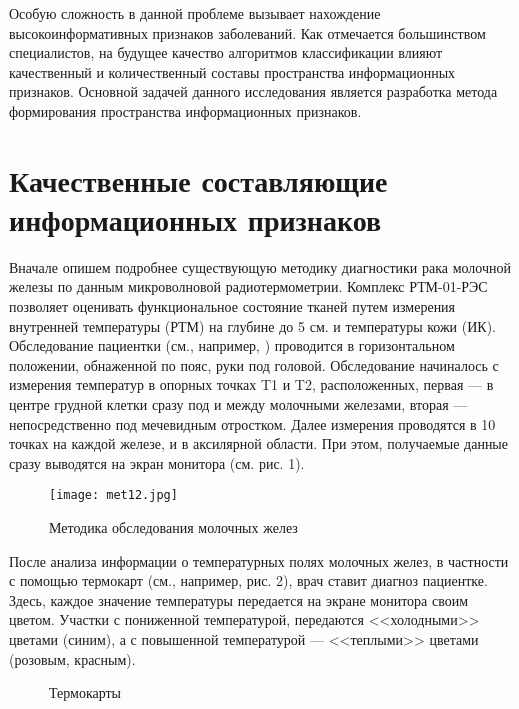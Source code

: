 Особую сложность в данной проблеме вызывает нахождение
высокоинформативных признаков заболеваний. Как отмечается
большинством специалистов, на будущее качество алгоритмов
классификации влияют качественный и количественный составы
пространства информационных признаков. Основной задачей данного
исследования является разработка метода формирования пространства
информационных признаков.

\section{Качественные составляющие информационных признаков}

Вначале опишем подробнее существующую методику диагностики рака молочной железы по данным микроволновой радиотермометрии.
Комплекс РТМ-01-РЭС позволяет оценивать функциональное состояние
тканей путем измерения внутренней температуры (РТМ) на глубине до
5 см. и температуры кожи (ИК). Обследование пациентки (см.,
например, \cite{vaysblat}) проводится в горизонтальном положении,
обнаженной по пояс, руки под головой. Обследование начиналось с
измерения температур в опорных точках T1 и T2, расположенных,
первая ---  в центре грудной клетки сразу под и между молочными
железами, вторая --- непосредственно под мечевидным отростком. Далее
измерения проводятся в 10 точках на каждой железе, и в аксилярной
области. При этом,  получаемые данные сразу выводятся на экран
монитора (см. рис. 1).


\begin{figure}[!h]\begin{center}
\texttt{[image: met12.jpg]}
\caption{Методика обследования молочных желез}
\end{center}\end{figure}


После анализа информации о температурных полях молочных желез, в
частности с помощью термокарт (см., например, рис. 2), врач ставит
диагноз пациентке. Здесь, каждое значение температуры передается
на экране монитора своим цветом. Участки с пониженной
температурой, передаются <<холодными>> цветами (синим), а с
повышенной температурой --- <<теплыми>> цветами (розовым, красным).

\begin{figure}[!h]
\caption{Термокарты}
\vspace*{5mm}
\end{figure}




